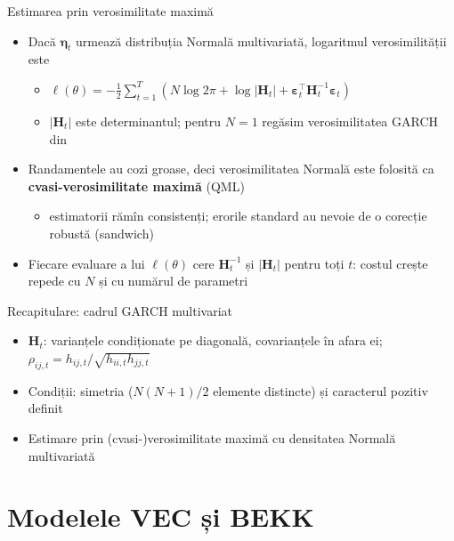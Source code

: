 \begin{frame}{Estimarea prin verosimilitate maximă}
\itemsize{\small}
\begin{itemize}
    \item Dacă $\boldsymbol{\eta}_t$ urmează distribuția Normală multivariată, logaritmul verosimilității este
    \begin{itemize}
        \item $\ell(\theta) = -\frac12\sum_{t=1}^{T}\left(N\log 2\pi + \log|\mathbf{H}_t| + \boldsymbol{\varepsilon}_t^\top\mathbf{H}_t^{-1}\boldsymbol{\varepsilon}_t\right)$
        \item $|\mathbf{H}_t|$ este determinantul; pentru $N = 1$ regăsim verosimilitatea GARCH din 
    \end{itemize}
    \item Randamentele au cozi groase, deci verosimilitatea Normală este folosită ca \textbf{cvasi-verosimilitate maximă} (QML)
    \begin{itemize}
        \item estimatorii rămîn consistenți; erorile standard au nevoie de o corecție robustă (sandwich)
    \end{itemize}
    \item Fiecare evaluare a lui $\ell(\theta)$ cere $\mathbf{H}_t^{-1}$ și $|\mathbf{H}_t|$ pentru toți $t$: costul crește repede cu $N$ și cu numărul de parametri
\end{itemize}
\end{frame}

\begin{frame}{Recapitulare: cadrul GARCH multivariat}
\itemsize{\small}
\begin{itemize}
    \item $\mathbf{H}_t$: varianțele condiționate pe diagonală, covarianțele în afara ei; $\rho_{ij,t} = h_{ij,t}/\sqrt{h_{ii,t}h_{jj,t}}$
    \item Condiții: simetria ($N(N+1)/2$ elemente distincte) și caracterul pozitiv definit
    \item Estimare prin (cvasi-)verosimilitate maximă cu densitatea Normală multivariată
\end{itemize}
\end{frame}


\section{Modelele VEC și BEKK}

